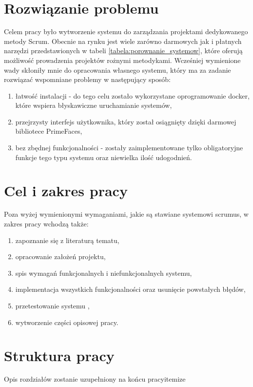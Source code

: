 \section{Rozwiązanie problemu}

Celem pracy było wytworzenie systemu do zarządzania projektami dedykowanego metody Scrum. Obecnie na rynku jest wiele zarówno darmowych jak i płatnych narzędzi przedstawionych w tabeli \ref{tabela:porownanie_systemow}, które oferują możliwość prowadzenia projektów rożnymi metodykami. Wcześniej wymienione wady skłoniły mnie do opracowania własnego systemu, który ma za zadanie rozwiązać wspomniane problemy w następujący sposób:
\begin{enumerate}
	\item łatwość instalacji - do tego celu zostało wykorzystane oprogramowanie docker, które wspiera błyskawiczne uruchamianie systemów,
	\item przejrzysty interfejs użytkownika, który został osiągnięty dzięki darmowej bibliotece PrimeFaces,
	\item bez zbędnej funkcjonalności - zostały zaimplementowane tylko obligatoryjne funkcje tego typu systemu oraz niewielka ilość udogodnień.
\end{enumerate}

\section{Cel i zakres pracy}
Poza wyżej wymienionymi wymaganiami, jakie są stawiane systemowi scrumus, w zakres pracy wchodzą także:
\begin{enumerate}
	\item zapoznanie się z literaturą tematu,
	\item opracowanie założeń projektu,
	\item spis wymagań funkcjonalnych i niefunkcjonalnych systemu,
	\item implementacja wszystkich funkcjonalności oraz usunięcie powstałych błędów,
	\item przetestowanie systemu ,
	\item wytworzenie części opisowej pracy.
	
\end{enumerate}


\section{Struktura pracy}
Opis rozdziałów zostanie uzupełniony na końcu pracyitemize